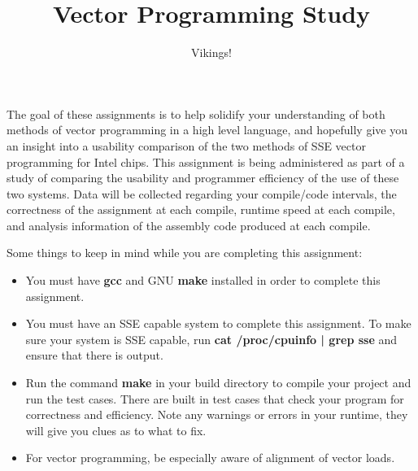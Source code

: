 \documentclass[12pt]{article}
\title{Vector Programming Study}
\author{Vikings!}
\begin{document}
\maketitle

\par The goal of these assignments is to help solidify your understanding of both methods of vector programming in a high level language, and hopefully give you an insight into a usability comparison of the two methods of SSE vector programming for Intel chips.
This assignment is being administered as part of a study of comparing the usability and programmer efficiency of the use of these two systems.
Data will be collected regarding your compile/code intervals, the correctness of the assignment at each compile, runtime speed at each compile, and analysis information of the assembly code produced at each compile.

\noindent Some things to keep in mind while you are completing this assignment:

\begin{itemize}
\item You must have \textbf{gcc} and GNU \textbf{make} installed in order to complete this assignment.
\item You must have an SSE capable system to complete this assignment.
To make sure your system is SSE capable, run \textbf{cat /proc/cpuinfo | grep sse} and ensure that there is output.
\item Run the command \textbf{make} in your build directory to compile your project and run the test cases.
There are built in test cases that check your program for correctness and efficiency.
Note any warnings or errors in your runtime, they will give you clues as to what to fix.
\item For vector programming, be especially aware of alignment of vector loads.
\end{itemize}
\end{document}

